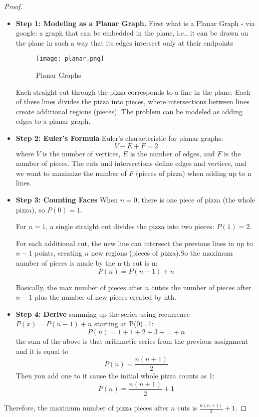 \documentclass[10pt, AMS Euler]{article}
\begin{document}
    \begin{proof}
        \begin{itemize}
            \item \textbf{Step 1: Modeling as a Planar Graph.} 
            First what is a Planar Graph - via google: a graph that can be embedded in the plane, i.e., it can be drawn on the plane in such a way that its edges intersect only at their endpoints
                \begin{figure}[h!]
                    \centering
                    \texttt{[image: planar.png]} %
                    \caption{Planar Graphs}
                    \label{fig:planar_graphs}
                \end{figure}
            
            Each straight cut through the pizza corresponds to a line in the plane. Each of these lines divides the pizza into pieces, where intersections between lines create additional regions (pieces). The problem can be modeled as adding edges to a planar graph.
    
            \item \textbf{Step 2: Euler’s Formula} Euler’s characteristic for planar graphs:
            \[
            V - E + F = 2
            \]
            where $V$ is the number of vertices, $E$ is the number of edges, and $F$ is the number of pieces. The cuts and intersections define edges and vertices, and we want to maximize the number of $F$ (pieces of pizza) when adding up to n lines.
    
            \item \textbf{Step 3: Counting Faces} When $n = 0$, there is one piece of pizza (the whole pizza), so $P(0) = 1$.
    
            For $n = 1$, a single straight cut divides the pizza into two pieces: $P(1) = 2$.
    
            For each additional cut, the new line can intersect the previous lines in up to $n-1$ points, creating $n$ new regions (pieces of pizza).So the maximum number of pieces is made by the n-th cut is n:
            \[
            P(n)=P(n-1)+n
            \]      

            Basically, the max number of pieces after $n$ cutsis the number of pieces after $n-1$ plus the number of new pieces created by nth. 
            
            \item \textbf{Step 4: Derive} summing up the series using recurrence $P(x)=P(n-1)+n$ starting at P(0)=1:
            \[
            P(n) = 1+1+2+3+...+n
            \]
            the sum of the above is that arithmetic series from the previous assignment and it is equal to 
            \[
            P(n) = \frac{n(n+1)}{2}
            \]
            Then you add one to it cause the initial whole pizza counts as 1:
            \[
            P(n) = \frac{n(n+1)}{2} + 1
            \]
        \end{itemize}
        
        Therefore, the maximum number of pizza pieces after $n$ cuts is $\frac{n(n+1)}{2} + 1$.
    \end{proof}
    
\end{document}

